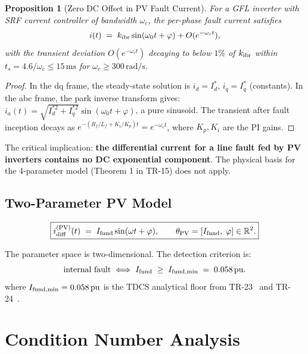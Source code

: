 \documentclass[11pt, a4paper]{article}
\newtheorem{proposition}{Proposition}
\newcommand{\pu}{\,\text{pu}}
\newcommand{\ms}{\,\text{ms}}
\newcommand{\thpv}{\theta_{\rm PV}}
\newcommand{\kIBR}{k_{\rm ibr}}
\begin{document}
\begin{proposition}[Zero DC Offset in PV Fault Current]
\label{prop:zero_dc}
For a GFL inverter with SRF current controller of bandwidth $\omega_c$, the
per-phase fault current satisfies
\begin{equation}
  i(t) \;=\; \kIBR\sin(\omega_0 t + \varphi) + O(e^{-\omega_c t}),
  \label{eq:pv_current}
\end{equation}
with the transient deviation $O(e^{-\omega_c t})$ decaying to below $1\%$
of $\kIBR$ within $t_s = 4.6/\omega_c \leq 15\ms$ for $\omega_c \geq 300\,\text{rad/s}$.
\end{proposition}
\begin{proof}
In the dq frame, the steady-state solution is $i_d = I_d^*$, $i_q = I_q^*$
(constants).  In the abc frame, the park inverse transform gives:
$i_a(t) = \sqrt{I_d^{*2} + I_q^{*2}}\sin(\omega_0 t + \varphi)$,
a pure sinusoid.  The transient after fault inception decays as
$e^{-(R_f/L_f + K_i/K_p)t} = e^{-\omega_c t}$, where $K_p, K_i$ are the
PI gains.
\end{proof}

The critical implication: \textbf{the differential current for a line fault
fed by PV inverters contains no DC exponential component}.  The physical
basis for the 4-parameter model (Theorem 1 in TR-15) does not apply.

\subsection{Two-Parameter PV Model}

\begin{equation}
  \boxed{i_{\rm diff}^{(\rm PV)}(t) \;=\; I_{\rm fund}\sin(\omega t + \varphi),
  \qquad \thpv = [I_{\rm fund},\;\varphi] \in \mathbb{R}^2.}
  \label{eq:2param}
\end{equation}

The parameter space is two-dimensional.  The detection criterion is:
\begin{equation}
  \text{internal fault} \;\Longleftrightarrow\;
  I_{\rm fund} \;\geq\; I_{\rm fund,min} \;=\; 0.058\pu.
  \label{eq:detect}
\end{equation}
where $I_{\rm fund,min} = 0.058\pu$ is the TDCS analytical floor from
TR-23~\cite{SAMBP_TR23} and TR-24~\cite{SAMBP_TR24}.

\section{Condition Number Analysis}
\label{sec:condition_number}
\end{document}
